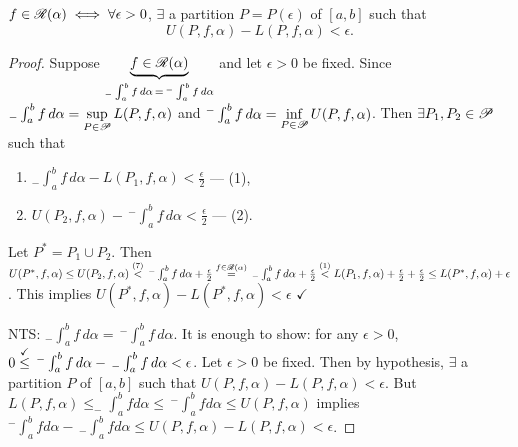 \documentclass[]{article}
\begin{document}
\begin{theorem}
	\label{thm-6-6}
	$f\in\ms R(\alpha) \iff \forall\epsilon>0$, $\exists$ a partition $P=P(\epsilon)$ of $[a,b]$ such that $$U(P,f,\alpha) - L(P,f,\alpha)<\epsilon. $$
\end{theorem}
\begin{proof}
	\say{$\implies$} Suppose $\ub{_-\int_a^bf\,d\alpha\, = \, ^-\int_a^bf\,d\alpha}{f\in\ms R(\alpha)}$ and let $\epsilon>0$ be fixed.
	Since $_-\int_a^bf\,d\alpha = \ds\sup_{P\in\ms P} L(P,f,\alpha)$ and $^-\int_a^bf\,d\alpha = \ds\inf_{P\in\ms P} U(P,f,\alpha)$.
	Then $\exists P_1,P_2\in\ms P$ such that 
	\begin{enumerate}
		\item[] $_-\int_a^b f\,d\alpha - L(P_1,f,\alpha) < \frac\epsilon2$ --- (1), 
		\item[] $U(P_2,f,\alpha) -\,^-\int_a^bf\,d\alpha < \frac\epsilon2$ --- (2).
	\end{enumerate}
	Let $P^* = P_1\cup P_2$. Then $U(P^*,f,\alpha) \leq U(P_2,f,\alpha) \os{(7)}< \,^-\int_a^b f\,d\alpha + \frac\epsilon2 \os{f\in\ms R(\alpha)}= \,_-\int_a^bf\,d\alpha + \frac\epsilon2 \os{(1)}< L(P_1,f,\alpha) + \frac\epsilon2 + \frac\epsilon2 \leq L(P^*,f,\alpha) + \epsilon$.
	This implies $U(P^*,f,\alpha)-L(P^*,f,\alpha)<\epsilon$ $\checkmark$

	\say{$\Lla$} NTS: $_-\int_a^bf\,d\alpha = \,^-\int_a^bf\,d\alpha$.
	It is enough to show: for any $\epsilon>0$, $0\os\checkmark\leq \,^-\int_a^bf\,d\alpha - \,_-\int_a^bf\,d\alpha<\epsilon$.
	Let $\epsilon>0$ be fixed. Then by hypothesis, $\exists$ a partition $P$ of $[a,b]$ such that $U(P,f,\alpha)-L(P,f,\alpha)<\epsilon$.
	But $L(P,f,\alpha) \leq _-\int_a^bfd\alpha \leq \,^-\int_a^bfd\alpha \leq U(P,f,\alpha)$ implies $^-\int_a^bfd\alpha-\,_-\int_a^bfd\alpha \leq U(P,f,\alpha) - L(P,f,\alpha) < \epsilon$.
\end{proof}
\end{document}
